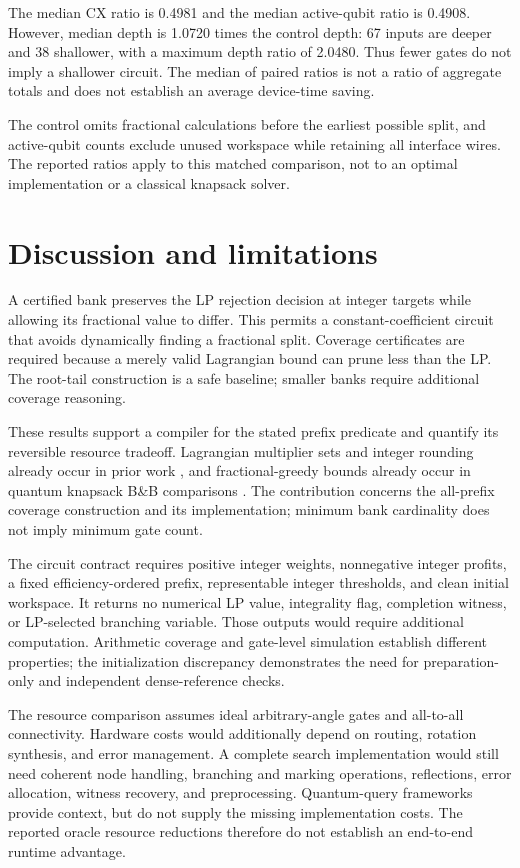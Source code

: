 \documentclass[referee,pdflatex,sn-mathphys-num]{sn-jnl}
\theoremstyle{thmstyleone}
\theoremstyle{thmstyletwo}
\begin{document}
The median CX ratio is 0.4981 and the median active-qubit ratio is 0.4908. However, median depth is 1.0720 times the control depth: 67 inputs are deeper and 38 shallower, with a maximum depth ratio of 2.0480. Thus fewer gates do not imply a shallower circuit. The median of paired ratios is not a ratio of aggregate totals and does not establish an average device-time saving.

The control omits fractional calculations before the earliest possible split, and active-qubit counts exclude unused workspace while retaining all interface wires. The reported ratios apply to this matched comparison, not to an optimal implementation or a classical knapsack solver.

\section{Discussion and limitations}\label{sec:discussion}
A certified bank preserves the LP rejection decision at integer targets while allowing its fractional value to differ. This permits a constant-coefficient circuit that avoids dynamically finding a fractional split. Coverage certificates are required because a merely valid Lagrangian bound can prune less than the LP. The root-tail construction is a safe baseline; smaller banks require additional coverage reasoning.

These results support a compiler for the stated prefix predicate and quantify its reversible resource tradeoff. Lagrangian multiplier sets and integer rounding already occur in prior work \cite{bozejko2026}, and fractional-greedy bounds already occur in quantum knapsack B\&B comparisons \cite{wilkening2025}. The contribution concerns the all-prefix coverage construction and its implementation; minimum bank cardinality does not imply minimum gate count.

The circuit contract requires positive integer weights, nonnegative integer profits, a fixed efficiency-ordered prefix, representable integer thresholds, and clean initial workspace. It returns no numerical LP value, integrality flag, completion witness, or LP-selected branching variable. Those outputs would require additional computation. Arithmetic coverage and gate-level simulation establish different properties; the initialization discrepancy demonstrates the need for preparation-only and independent dense-reference checks.

The resource comparison assumes ideal arbitrary-angle gates and all-to-all connectivity. Hardware costs would additionally depend on routing, rotation synthesis, and error management. A complete search implementation would still need coherent node handling, branching and marking operations, reflections, error allocation, witness recovery, and preprocessing. Quantum-query frameworks \cite{ref35,ref24} provide context, but do not supply the missing implementation costs. The reported oracle resource reductions therefore do not establish an end-to-end runtime advantage.
\end{document}
